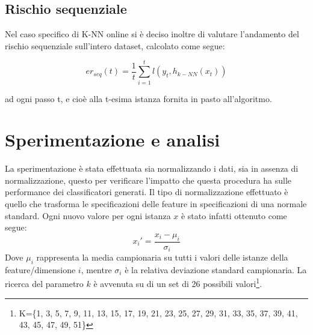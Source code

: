 \documentclass[fleqn,10pt]{SelfArx} %
\begin{document}
\subsection{Rischio sequenziale}
Nel caso specifico di K-NN online si è deciso inoltre di valutare l'andamento del rischio sequenziale\cite{cesa:seq} sull'intero dataset, calcolato come segue:

\[
er_{seq}(t)=\frac{1}{t}\sum_{i=1}^{t} l(y_t,h_{k-NN}(x_t))
\]

ad ogni passo t, e cioè alla t-esima istanza fornita in pasto all'algoritmo.
\section{Sperimentazione e analisi}
La sperimentazione è stata effettuata sia normalizzando i dati, sia in assenza di normalizzazione, questo per verificare l'impatto che questa procedura ha sulle performance dei classificatori generati.
\newline
\newline
Il tipo di normalizzazione effettuato è quello che trasforma le specificazioni delle feature in specificazioni di una normale standard. Ogni nuovo valore per ogni istanza $x$ è stato infatti ottenuto come segue:
\[
x_{i}' = \frac{x_i - \mu_i}{\sigma_i}
\]
Dove $\mu_i$ rappresenta la media campionaria su tutti i valori delle istanze della feature/dimensione $i$, mentre $\sigma_i$ è la relativa deviazione standard campionaria.
\newline
\newline
La ricerca del parametro $k$ è avvenuta su di un set di 26 possibili valori\footnote{\footnotesize{K=\{1, 3, 5, 7, 9, 11, 13, 15, 17, 19, 21, 23, 25, 27, 29, 31, 33, 35, 37, 39, 41, 43, 45, 47, 49, 51\}}}.
\end{document}
